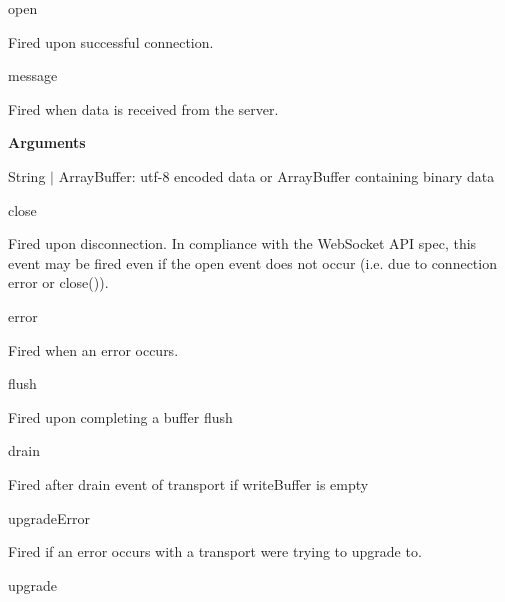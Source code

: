\begin{DoxyItemize}
\item {\ttfamily open}
\begin{DoxyItemize}
\item Fired upon successful connection.
\end{DoxyItemize}
\item {\ttfamily message}
\begin{DoxyItemize}
\item Fired when data is received from the server.
\item {\bfseries Arguments}
\begin{DoxyItemize}
\item {\ttfamily String} $\vert$ {\ttfamily Array\+Buffer}\+: utf-\/8 encoded data or Array\+Buffer containing binary data
\end{DoxyItemize}
\end{DoxyItemize}
\item {\ttfamily close}
\begin{DoxyItemize}
\item Fired upon disconnection. In compliance with the Web\+Socket A\+PI spec, this event may be fired even if the {\ttfamily open} event does not occur (i.\+e. due to connection error or {\ttfamily close()}).
\end{DoxyItemize}
\item {\ttfamily error}
\begin{DoxyItemize}
\item Fired when an error occurs.
\end{DoxyItemize}
\item {\ttfamily flush}
\begin{DoxyItemize}
\item Fired upon completing a buffer flush
\end{DoxyItemize}
\item {\ttfamily drain}
\begin{DoxyItemize}
\item Fired after {\ttfamily drain} event of transport if write\+Buffer is empty
\end{DoxyItemize}
\item {\ttfamily upgrade\+Error}
\begin{DoxyItemize}
\item Fired if an error occurs with a transport we\textquotesingle{}re trying to upgrade to.
\end{DoxyItemize}
\item {\ttfamily upgrade}
\begin{DoxyItemize}

\end{DoxyItemize}
\end{DoxyItemize}
